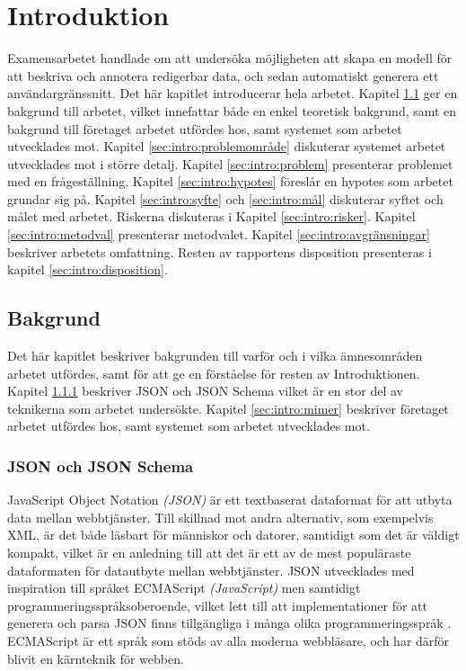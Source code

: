 \chapter{Introduktion}
Examensarbetet handlade om att undersöka möjligheten att skapa en modell för att beskriva och annotera redigerbar data, och sedan automatiskt generera ett användargränssnitt. Det här kapitlet introducerar hela arbetet. Kapitel \ref{sec:intro:bakgrund} ger en bakgrund till arbetet, vilket innefattar både en enkel teoretisk bakgrund, samt en bakgrund till företaget arbetet utfördes hos, samt systemet som arbetet utvecklades mot. Kapitel \ref{sec:intro:problemområde} diskuterar systemet arbetet utvecklades mot i större detalj. Kapitel \ref{sec:intro:problem} presenterar problemet med en frågeställning. Kapitel \ref{sec:intro:hypotes} föreslår en hypotes som arbetet grundar sig på. Kapitel \ref{sec:intro:syfte} och \ref{sec:intro:mål} diskuterar syftet och målet med arbetet. Riskerna diskuteras i Kapitel \ref{sec:intro:risker}. Kapitel \ref{sec:intro:metodval} presenterar metodvalet. Kapitel \ref{sec:intro:avgränsningar} beskriver arbetets omfattning. Resten av rapportens disposition presenteras i kapitel \ref{sec:intro:disposition}.

\section{Bakgrund}
\label{sec:intro:bakgrund}
Det här kapitlet beskriver bakgrunden till varför och i vilka ämnesområden arbetet utfördes, samt för att ge en förståelse för resten av Introduktionen. Kapitel \ref{sec:intro:json} beskriver JSON och JSON Schema vilket är en stor del av teknikerna som arbetet undersökte. Kapitel \ref{sec:intro:mimer} beskriver företaget arbetet utfördes hos, samt systemet som arbetet utvecklades mot.

\subsection{JSON och JSON Schema}
\label{sec:intro:json}
JavaScript Object Notation \textit{(JSON)} är ett textbaserat dataformat för att utbyta data mellan webbtjänster. Till skillnad mot andra alternativ, som exempelvis XML, är det både läsbart för människor och datorer, samtidigt som det är väldigt kompakt, vilket är en anledning till att det är ett av de mest populäraste dataformaten för datautbyte mellan webbtjänster. \cite{Pezoa2016} JSON utvecklades med inspiration till språket ECMAScript \textit{(JavaScript)} men samtidigt programmeringsspråksoberoende, vilket lett till att implementationer för att generera och parsa JSON finns tillgängliga i många olika programmeringsspråk \cite{ECMA2013}. ECMAScript är ett språk som stöds av alla moderna webbläsare, och har därför blivit en kärnteknik för webben.

